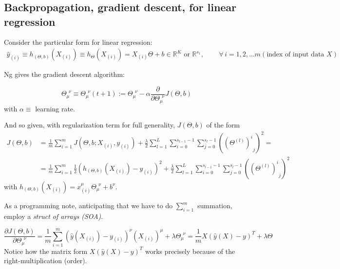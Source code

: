 \documentclass[10pt]{amsart}
\begin{document}
\begin{multicols*}{2}
\subsection{Backpropagation, gradient descent, for linear regression}  

Consider the particular form for linear regression:  
\[
\begin{gathered}
	\widehat{y}_{(i)}  \equiv h_{ (\Theta,b)}(X_{(i)}) \equiv h_{\Theta}(X_{(i)})=X_{(i)}\Theta + b \in \mathbb{R}^K \text{ or } \mathbb{R}^{s_1}, \qquad \, \forall \, i =1,2,\dots m (\text{index of input data $X$})
\end{gathered}
\]

Ng \cite{CS229} gives the gradient descent algorithm: 

\[
\Theta_{\mu}^{ \  \  \nu} \equiv \Theta_{\mu}^{ \  \  \nu}(t+1) := \Theta_{\mu}^{ \  \  \nu} - \alpha \frac{\partial }{ \partial \Theta_{\mu}^{ \  \  \nu} } J(\Theta,b)
\]
with $\alpha \equiv $ learning rate.  

And so given, with regularization term for full generality, $J(\Theta,b)$ of the form 
\[
\begin{aligned}
J(\Theta,b) & = \frac{1}{m} \sum_{i=1}^m J(\Theta,b; X_{(i)}, y_{(i)}) + \frac{\lambda}{2} \sum_{l=1}^L \sum_{i=0}^{s_{l-1}-1} \sum_{j=0}^{ s_l-1} ((\Theta^{(l)})^i_{\  \  j})^2 = \\ 
& =  \frac{ 1}{m} \sum_{i=1}^m \frac{1}{2} ( h_{(\Theta,b)}(X_{(i)}) - y_{(i)})^2 + \frac{\lambda}{2} \sum_{l=1}^L \sum_{i=0}^{s_{l-1}-1} \sum_{j=0}^{ s_l-1} ((\Theta^{(l)})^i_{\  \  j})^2
\end{aligned}
\]
with $h_{(\Theta,b)}(X_{(i)}) = x_{(i)}^{\mu} \Theta_{\mu}^{ \  \  \nu} + b^{\nu}$.  



As a programming note, anticipating that we have to do $\sum_{i=1}^m$ summation, employ a \emph{struct of arrays (SOA)}.  

\begin{equation}
\frac{\partial J(\Theta,b)}{ \partial \Theta_{\mu}^{ \  \  \nu} } = \frac{1}{m} \sum_{i=1}^m (\widehat{y}(X_{(i)}) - y_{(i)} )^{\nu} (X_{(i)})^{\mu} + \lambda \Theta_{\mu}^{ \  \  \nu} = \frac{1}{m} X(\widehat{y}(X) - y)^T + \lambda \Theta
\end{equation}
Notice how the matrix form $X(\widehat{y}(X) -y)^T$ works precisely because of the right-multiplication (order).  


\end{multicols*}
\end{document}
